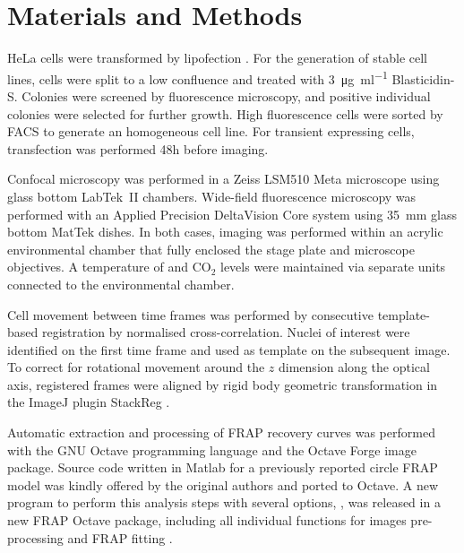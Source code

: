 \section{Materials and Methods}

  HeLa cells were transformed by lipofection
  .  For the generation of stable cell
  lines, cells were split to a low confluence and treated with
  \SI{3}{\ug\per\ml} Blasticidin-S.  Colonies were screened by
  fluorescence microscopy, and positive individual colonies were
  selected for further growth.  High fluorescence cells were sorted by
  FACS to generate an homogeneous cell line.  For transient expressing
  cells, transfection was performed 48h before imaging.

  Confocal microscopy was performed in a Zeiss LSM510 Meta microscope
  using glass bottom LabTek~II chambers.  Wide-field fluorescence
  microscopy was performed with an Applied Precision DeltaVision Core
  system using \SI{35}{\mm} glass bottom MatTek dishes.  In both
  cases, imaging was performed within an acrylic environmental chamber
  that fully enclosed the stage plate and microscope objectives.  A
  temperature of  and  CO$_2$ levels were maintained
  via separate units connected to the environmental chamber.

  Cell movement between time frames was performed by consecutive
  template-based registration by normalised cross-correlation.  Nuclei
  of interest were identified on the first time frame and used as
  template on the subsequent image.  To correct for rotational
  movement around the $z$ dimension along the optical axis, registered
  frames were aligned by rigid body geometric transformation in the
  ImageJ \citep{imagej1} plugin StackReg \citep{stackreg}.

  Automatic extraction and processing of FRAP recovery curves was
  performed with the GNU Octave programming language \citep{octave}
  and the Octave Forge image package.  Source code written in Matlab
  for a previously reported circle FRAP model
  \citep{mcnally-frap-code} was kindly offered by the original authors
  and ported to Octave.  A new program to perform this analysis steps
  with several options, , was released in a new
  FRAP Octave package, including all individual functions for images
  pre-processing and FRAP fitting .
